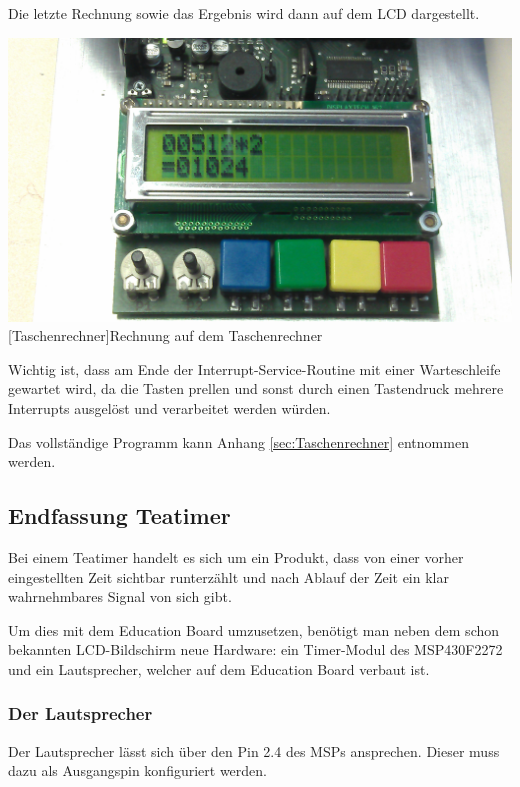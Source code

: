 \documentclass[12pt,a4paper,bibliography=totocnumbered,listof=totocnumbered]{scrartcl}
\begin{document}
Die letzte Rechnung sowie das Ergebnis wird dann auf dem LCD dargestellt.

\vspace{1em}
\begin{minipage}{\linewidth}
	\centering
	\includegraphics[width=0.7\linewidth]{img/Taschenrechner.jpg}
	[Taschenrechner]{Rechnung auf dem Taschenrechner}
	\label{fig:Taschenrechner}
\end{minipage}

Wichtig ist, dass am Ende der Interrupt-Service-Routine mit einer Warteschleife gewartet wird, da die Tasten prellen und sonst durch einen Tastendruck mehrere Interrupts ausgelöst und verarbeitet werden würden.

Das vollständige Programm kann Anhang \ref{sec:Taschenrechner} entnommen werden.

\pagebreak

\subsection{Endfassung Teatimer}
\label{VersuchTeatimer}
Bei einem Teatimer handelt es sich um ein Produkt, dass von einer vorher eingestellten Zeit sichtbar runterzählt und nach Ablauf der Zeit ein klar wahrnehmbares Signal von sich gibt.

Um dies mit dem Education Board umzusetzen, benötigt man neben dem schon bekannten LCD-Bildschirm neue Hardware: ein Timer-Modul des MSP430F2272 und ein Lautsprecher, welcher auf dem Education Board verbaut ist.


\subsubsection{Der Lautsprecher}
\label{Lautsprecher}
Der Lautsprecher lässt sich über den Pin 2.4 des MSPs ansprechen. Dieser muss dazu als Ausgangspin konfiguriert werden.
\vspace{1em}

\end{document}
